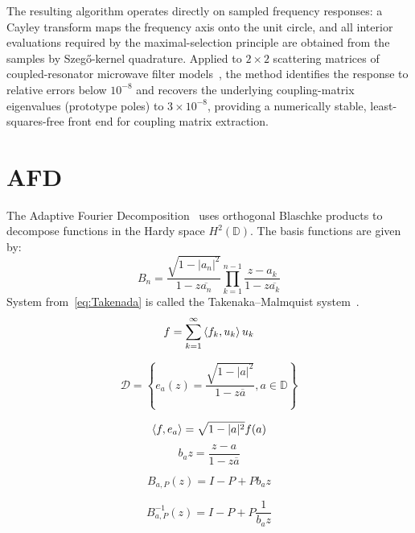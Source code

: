 \documentclass[journal]{IEEEtran}%
\newcommand{\conj}[1]{\overline{#1}}
\newcommand{\inner}[2]{\braket{#1,#2}}
\begin{document}
The resulting algorithm operates directly on sampled frequency responses: a Cayley transform maps the frequency axis onto the unit circle, and all interior evaluations required by the maximal-selection principle are obtained from the samples by Szeg\H{o}-kernel quadrature. Applied to $2\times 2$ scattering matrices of coupled-resonator microwave filter models~\cite{cameron2003advanced}, the method identifies the response to relative errors below $10^{-8}$ and recovers the underlying coupling-matrix eigenvalues (prototype poles) to $3\times 10^{-8}$, providing a numerically stable, least-squares-free front end for coupling matrix extraction.

\section{AFD}

The Adaptive Fourier Decomposition~\cite{qian2013adaptive} uses orthogonal Blaschke products to decompose functions in the Hardy space $H^2(\mathbb{D})$. The basis functions are given by:
\begin{equation}\label{eq:Takenada}
  B_{n} = \frac{\sqrt{1 - |a_n|^2}}{1 - z\conj{a_n}}\prod_{k=1}^{n-1}{\frac{z - a_k}{1 - z\conj{a_k}}}
\end{equation}
System from~\eqref{eq:Takenada} is called the Takenaka--Malmquist system~\cite{takenaka1925orthogonal,malmquist1925etude}.
\begin{equation}\label{eq:fproj}
  f = \sum_{k=1}^{\infty} \inner{f_k}{u_k} u_k
\end{equation}

\begin{equation}
   \mathcal{D} = \left\{ e_a(z) = \frac{\sqrt{1 - |a|^2}}{1 - z\conj{a}}, a \in \mathbb{D} \right\}
\end{equation}

\begin{equation}
  \inner{f}{e_a} = \sqrt{1-|a|^2}f(a)
\end{equation}
\begin{equation}
  b_a{z} = \frac{z -a}{1 - z\conj{a}}
\end{equation}

\begin{equation}
B_{a,P}(z) = I - P + Pb_a{z}
\end{equation}

\begin{equation}
B^{-1}_{a,P}(z) = I - P + P\frac{1}{b_a{z}}
\end{equation}
\end{document}
